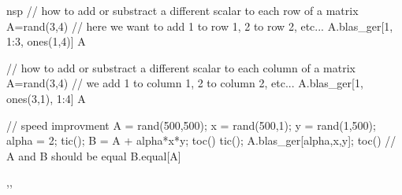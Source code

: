 \begin{examples}
\begin{mintednsp}{nsp}
// how to add or substract a different scalar to each row of a matrix 
A=rand(3,4)
// here we want to add 1 to row 1, 2 to row 2, etc...
A.blas_ger[1, 1:3, ones(1,4)]
A

// how to add or substract a different scalar to each column of a matrix 
A=rand(3,4)
// we add 1 to column 1, 2 to column 2, etc...
A.blas_ger[1, ones(3,1), 1:4]
A

// speed improvment
A = rand(500,500);
x = rand(500,1); y = rand(1,500); alpha = 2;
tic(); B = A + alpha*x*y; toc()
tic(); A.blas_ger[alpha,x,y]; toc()
// A and B should be equal
B.equal[A]
\end{mintednsp}

\end{examples}

\begin{manseealso}
,,
\end{manseealso}

